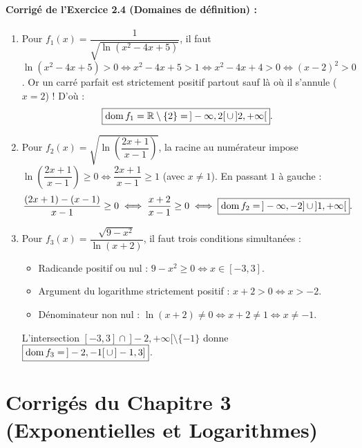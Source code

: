 \paragraph{Corrigé de l'Exercice 2.4 (Domaines de définition) :}
\begin{enumerate}[label=(\alph*)]
    \item Pour $f_1(x) = \dfrac{1}{\sqrt{\ln(x^2 - 4x + 5)}}$, il faut $\ln(x^2 - 4x + 5) > 0 \iff x^2 - 4x + 5 > 1 \iff x^2 - 4x + 4 > 0 \iff (x - 2)^2 > 0$. Or un carré parfait est strictement positif partout sauf là où il s'annule ($x = 2$) ! D'où :
    \[
        \boxed{\operatorname{dom} f_1 = \mathbb{R} \setminus \{2\} = \,]-\infty, 2[ \,\cup\, ]2, +\infty[}.
    \]
    \item Pour $f_2(x) = \sqrt{\ln\left(\dfrac{2x + 1}{x - 1}\right)}$, la racine au numérateur impose $\ln\left(\dfrac{2x + 1}{x - 1}\right) \ge 0 \iff \dfrac{2x + 1}{x - 1} \ge 1$ (avec $x \neq 1$). En passant $1$ à gauche :
    \[
        \frac{(2x + 1) - (x - 1)}{x - 1} \ge 0 \iff \frac{x + 2}{x - 1} \ge 0 \iff \boxed{\operatorname{dom} f_2 = \,]-\infty, -2] \,\cup\, ]1, +\infty[}.
    \]
    \item Pour $f_3(x) = \dfrac{\sqrt{9 - x^2}}{\ln(x + 2)}$, il faut trois conditions simultanées :
    \begin{itemize}
        \item Radicande positif ou nul : $9 - x^2 \ge 0 \iff x \in [-3, 3]$.
        \item Argument du logarithme strictement positif : $x + 2 > 0 \iff x > -2$.
        \item Dénominateur non nul : $\ln(x + 2) \neq 0 \iff x + 2 \neq 1 \iff x \neq -1$.
    \end{itemize}
    L'intersection $[-3, 3] \cap \,]-2, +\infty[ \setminus \{-1\}$ donne $\boxed{\operatorname{dom} f_3 = \,]-2, -1[ \,\cup\, ]-1, 3]}$.
\end{enumerate}

\section{Corrigés du Chapitre 3 (Exponentielles et Logarithmes)}

